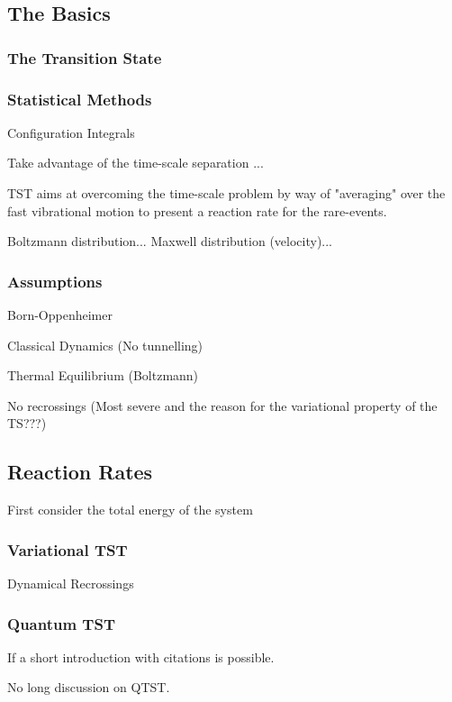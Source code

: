 \subsection{The Basics}

\subsubsection{The Transition State}
\placeholder

\subsubsection{Statistical Methods}

\bit
\item Configuration Integrals
\eit

Take advantage of the time-scale separation ...

TST aims at overcoming the time-scale problem by way of "averaging" over the fast vibrational motion to present a reaction rate for the rare-events.

Boltzmann distribution...
Maxwell distribution (velocity)...

\incomplete

\subsubsection{Assumptions}
\bit
\item Born-Oppenheimer
\item Classical Dynamics (No tunnelling)
\item Thermal Equilibrium (Boltzmann)
\item No recrossings (Most severe and the reason for the variational property of the TS???)
\eit
\placeholder

\subsection{Reaction Rates}

First consider the total energy of the system


\placeholder

\subsubsection{Variational TST}
\bit
\item Dynamical Recrossings
\eit

\subsubsection{Quantum TST}
\bit
\item If a short introduction with citations is possible.
\item No long discussion on QTST.
\eit

